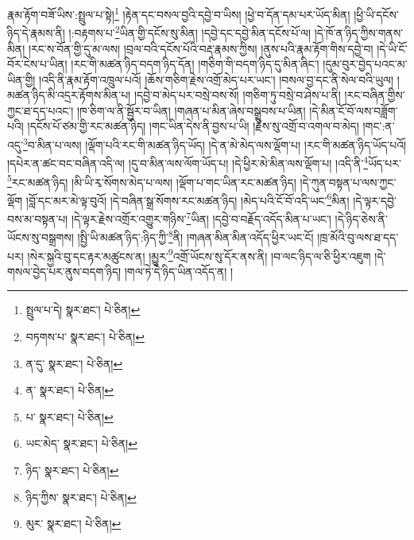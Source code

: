 རྣམ་རྟོག་བཟོ་ཡིས་:སྤྲུལ་པ་སྟེ།\footnote{སྤྲུལ་པ་དེ།  སྣར་ཐང་།  པེ་ཅིན། } །རྟེན་དང་བསལ་བྱའི་དབྱེ་བ་ཡིས། །ཕྱེ་བ་དོན་དམ་པར་ཡོད་མིན། །ཕྱི་ཡི་དངོས་ཉིད་དེ་རྣམས་ནི། །:བརྟགས་པ་\footnote{བཏགས་པ་  སྣར་ཐང་།  པེ་ཅིན། }ཡིན་གྱི་དངོས་སུ་མིན། །དབྱེ་དང་དབྱེ་མིན་དངོས་པོ་ལ། །དེ་ཁོ་ན་ཉིད་ཀྱིས་གནས་མིན། །རང་ས་བོན་གྱི་དུ་མ་ལས། །བྲལ་བའི་དངོས་པོའི་བརྡ་རྣམས་ཀྱིས། །ནུས་པའི་རྣམ་རྟོག་གིས་དབྱེ་བ། །དེ་ཡི་ངོ་བོར་ངེས་པ་ཡིན། །རང་གི་མཚན་ཉིད་བདག་ཉིད་དོན། །གཅིག་གི་བདག་ཉིད་དུ་མིན་ཞིང་། །དུམ་བུར་བྱེད་པའང་མ་ཡིན་གྱི། །འདི་ནི་རྣམ་རྟོག་འཁྲུལ་པའོ། །ཆོས་གཅིག་རྗེས་འགྲོ་མེད་པར་ཡང་། །བསལ་བྱ་དང་ནི་སེལ་བའི་ཡུལ། །མཚན་ཉིད་མི་འདྲར་རྟོགས་མིན་པ། །དབྱེ་བ་མེད་པར་བསྲེ་བས་སོ། །གཅིག་ཏུ་བསྲེ་བ་ཤེས་པ་ནི། །རང་བཞིན་གྱིས་ཀྱང་ཐ་དད་པའང་། །ཁ་ཅིག་ལ་ནི་སྦྱོར་བ་ཡིན། །གཞན་པ་མིན་ཞེས་བསྒྲུབས་པ་ཡིན། །དེ་མིན་ངོ་བོ་ལས་བཟློག་པའི། །དངོས་པོ་ཙམ་གྱི་རང་མཚན་ཉིད། །གང་ཡིན་དེས་ནི་བྱས་པ་ཡི། །རྗེས་སུ་འགྲོ་བ་འགལ་བ་མེད། །གང་:ན་འདུ་\footnote{ན་དུ་  སྣར་ཐང་།  པེ་ཅིན། }བ་མིན་པ་ལས། །ལྡོག་པའི་རང་གི་མཚན་ཉིད་ཡོད། །དེ་ན་མེ་མེད་ལས་ལྡོག་པ། །རང་གི་མཚན་ཉིད་ཡོད་པའོ། །དཔེར་ན་ཚང་བང་བཞིན་འདི་ལ། །དུ་བ་མིན་ལས་ལོག་ཡོད་པ། །དེ་ཕྱིར་མེ་མིན་ལས་ལྡོག་པ། །འདི་ནི་\footnote{ན་  སྣར་ཐང་།  པེ་ཅིན། }ཡོད་པར་\footnote{པ་  སྣར་ཐང་།  པེ་ཅིན། }རང་མཚན་ཉིད། །མི་ཡི་རྭ་སོགས་མེད་པ་ལས། །ལྡོག་པ་གང་ཡིན་རང་མཚན་ཉིད། །དེ་ཀུན་བསྟན་པ་ལས་ཀྱང་ལྡོག །བློ་དང་མར་མེ་ལྟ་བུའོ། །དེ་བཞིན་སྒྲ་སོགས་རང་མཚན་ཉིད། །མེད་པའི་ངོ་བོ་འདི་ཡང་\footnote{ཡང་མེད་  སྣར་ཐང་།  པེ་ཅིན། }མིན། །དེ་ལྟར་དབྱེ་བས་མ་བསྟན་པ། །དེ་ལྟར་རྗེས་འགྲོར་འགྱུར་གཉིས་\footnote{ཉིད་  སྣར་ཐང་།  པེ་ཅིན། }ཡིན། །དབྱེ་བ་བརྗོད་འདོད་མིན་པ་ཡང་། །དེ་ཉིད་ཅེས་ནི་ཡོངས་སུ་བསྒྲགས། །སྤྱི་ཡི་མཚན་ཉིད་:ཉིད་ཀྱི་\footnote{ཉིད་ཀྱིས་  སྣར་ཐང་།  པེ་ཅིན། }ནི། །གཞན་མིན་མིན་འདོད་ཕྱིར་ཡང་ངོ། །ཁྲ་མོའི་བུ་ལས་ཐ་དད་པར། །སེར་སྐྱའི་བུ་དང་རྟར་མཚུངས་ན། །མྱུར་\footnote{མུར་  སྣར་ཐང་།  པེ་ཅིན། }འགྲོ་ཡོངས་སུ་དོར་ནས་ནི། །བ་ལང་ཉིད་ལ་ཅི་ཕྱིར་འཇུག །དེ་གསལ་བྱེད་པར་ནུས་བདག་ཉིད། །གལ་ཏེ་དེ་ཉིད་ཡིན་འདོད་ན། །
